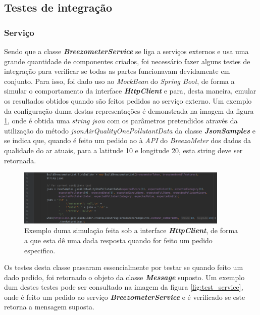\subsection{Testes de integração}
\subsubsection{Serviço}
Sendo que a classe \textbf{\textit{BreezometerService}} se liga a serviços externos e usa uma grande quantidade de componentes criados, foi necessário fazer alguns testes de integração para verificar se todas as partes funcionavam devidamente em conjunto. Para isso, foi dado uso ao \textit{MockBean} do \textit{Spring Boot}, de forma a simular o comportamento da interface \textbf{\textit{HttpClient}} e para, desta maneira, emular os resultados obtidos quando são feitos pedidos ao serviço externo. Um exemplo da configuração duma destas representações é demonstrada na imagem da figura \ref{fig:mock_http_client}, onde é obtida uma \textit{string json} com os parâmetros pretendidos através da utilização do método \textit{jsonAirQualityOnePollutantData} da classe \textbf{\textit{JsonSamples}} e se indica que, quando é feito um pedido ao à \textit{API} do \textit{BreezoMeter} dos dados da qualidade do ar atuais, para a latitude 10 e longitude 20, esta string deve ser retornada.

\begin{figure}[h]
   \centering
   \includegraphics[width=0.90\textwidth]{images/mock_http_client}
   \caption{Exemplo duma simulação feita sob a interface \textbf{\textit{HttpClient}}, de forma a que esta dê uma dada resposta quando for feito um pedido especifico.}
   \label{fig:mock_http_client}
\end{figure}

Os testes desta classe passaram essencialmente por testar se quando feito um dado pedido, foi retornado o objeto da classe \textbf{\textit{Message}} suposto. Um exemplo dum destes testes pode ser consultado na imagem da figura \ref{fig:test_service}, onde é feito um pedido ao serviço \textbf{\textit{BreezometerService}} e é verificado se este retorna a mensagem suposta.

